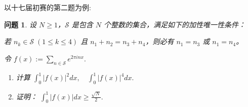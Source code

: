 \documentclass[12pt]{ctexart}  %
\newtheorem{question}{问题}[]
\begin{document}
以十七届初赛的第二题为例:
\begin{question}
    设 \(N \ge 1\)，\(\mathcal{S}\) 是包含 \(N\) 个整数的集合，满足如下的加性唯一性条件：

若 \(n_k \in \mathcal{S}\;(1 \le k \le 4)\) 且 \(n_1 + n_2 = n_3 + n_4\)，则必有 \(n_1 = n_3\) 或 \(n_1 = n_4\)。

令
\(
\displaystyle f(x) := \sum_{n\in\mathcal{S}} e^{2\pi i n x}.
\)

\begin{enumerate}
    \item 计算
    \(
    \displaystyle \int_0^1 |f(x)|^2 dx,\quad \int_0^1 |f(x)|^4 dx.
    \)
    \item 证明：
    \(
    \displaystyle \int_0^1 |f(x)| dx \ge \frac{\sqrt{N}}{2}.
    \)
\end{enumerate}
\end{question}
\end{document}
